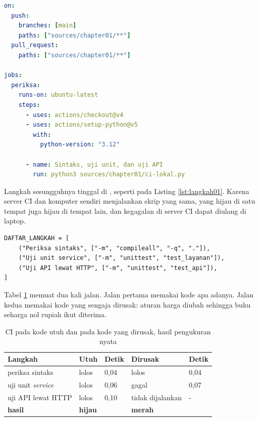 \begin{lstlisting}[language=yaml, caption={\textit{Workflow} CI bab ini, tersedia di \berkas{sources/chapter01/ci.yml}}, label={lst:ciyml01}]
on:
  push:
    branches: [main]
    paths: ["sources/chapter01/**"]
  pull_request:
    paths: ["sources/chapter01/**"]

jobs:
  periksa:
    runs-on: ubuntu-latest
    steps:
      - uses: actions/checkout@v4
      - uses: actions/setup-python@v5
        with:
          python-version: "3.12"

      - name: Sintaks, uji unit, dan uji API
        run: python3 sources/chapter01/ci-lokal.py
\end{lstlisting}

Langkah sesungguhnya tinggal di , seperti pada Listing
\ref{lst:langkah01}. Karena server CI dan komputer sendiri menjalankan skrip
yang sama, yang hijau di satu tempat juga hijau di tempat lain, dan kegagalan
di server CI dapat diulang di laptop.

\begin{lstlisting}[style=PythonStyle, caption={Tiga langkah CI, dari yang termurah, tersedia di \berkas{sources/chapter01/ci-lokal.py}}, label={lst:langkah01}]
DAFTAR_LANGKAH = [
    ("Periksa sintaks", ["-m", "compileall", "-q", "."]),
    ("Uji unit service", ["-m", "unittest", "test_layanan"]),
    ("Uji API lewat HTTP", ["-m", "unittest", "test_api"]),
]
\end{lstlisting}

Tabel \ref{tab:ci01} memuat dua kali jalan. Jalan pertama memakai kode apa
adanya. Jalan kedua memakai kode yang sengaja dirusak: aturan harga diubah
sehingga buku seharga nol rupiah ikut diterima.

\begin{table}[!htb]
  \centering
  \caption{CI pada kode utuh dan pada kode yang dirusak, hasil pengukuran
           nyata}
  \label{tab:ci01}
  \begin{tabularx}{\textwidth}{Xllll}
    \hline
    \textbf{Langkah} & \textbf{Utuh} & \textbf{Detik} & \textbf{Dirusak} & \textbf{Detik} \\
    \hline
    periksa sintaks & lolos & 0,04 & lolos & 0,04 \\
    \hline
    uji unit \textit{service} & lolos & 0,06 & gagal & 0,07 \\
    \hline
    uji API lewat HTTP & lolos & 0,10 & tidak dijalankan & - \\
    \hline
    \textbf{hasil} & \textbf{hijau} & & \textbf{merah} & \\
    \hline
  \end{tabularx}
\end{table}

